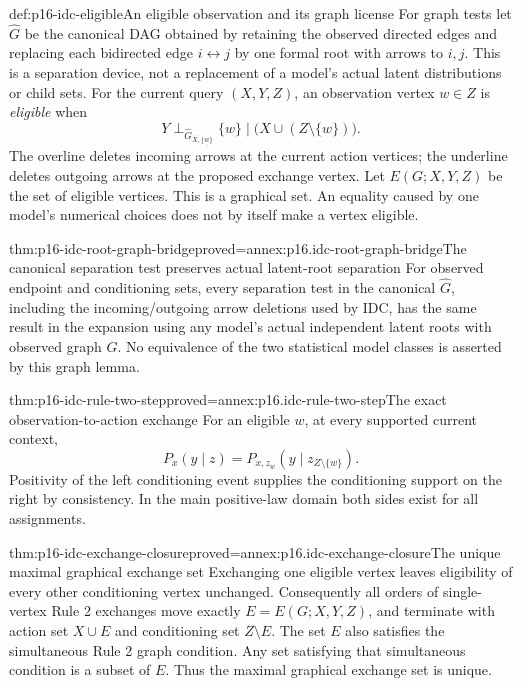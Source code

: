 \begin{hbdefinition}{def:p16-idc-eligible}{An eligible observation and its graph license}
For graph tests let \(\widehat G\) be the canonical DAG obtained
by retaining the observed directed edges and replacing each bidirected
edge \(i\leftrightarrow j\) by one formal root with arrows to
\(i,j\). This is a separation device, not a replacement of a
model's actual latent distributions or child sets. For the current query \((X,Y,Z)\), an
observation vertex \(w\in Z\) is \emph{eligible} when
\[
 Y\mathrel{\perp_{\widehat G_{\overline X,\underline{\{w\}}}}}
       \{w\}\mid\bigl(X\cup(Z\setminus\{w\})\bigr).
\]
The overline deletes incoming arrows at the current action vertices;
the underline deletes outgoing arrows at the proposed exchange vertex.
Let \(E(G;X,Y,Z)\) be the set of eligible vertices. This is a
graphical set. An equality caused by one model's numerical choices
does not by itself make a vertex eligible.
\end{hbdefinition}

\begin{hblemma}{thm:p16-idc-root-graph-bridge}{proved=annex:p16.idc-root-graph-bridge}{The canonical separation test preserves actual latent-root separation}
For observed endpoint and conditioning sets, every separation test in
the canonical \(\widehat G\), including the incoming/outgoing
arrow deletions used by IDC, has the same result in the expansion
using any model's actual independent latent roots with observed graph
\(G\). No equivalence of the two statistical model classes is
asserted by this graph lemma.
\end{hblemma}

\begin{hblemma}{thm:p16-idc-rule-two-step}{proved=annex:p16.idc-rule-two-step}{The exact observation-to-action exchange}
For an eligible \(w\), at every supported current context,
\[
 P_x(y\mid z)=P_{x,z_w}(y\mid z_{Z\setminus\{w\}}).
\]
Positivity of the left conditioning event supplies the conditioning
support on the right by consistency. In the main positive-law domain
both sides exist for all assignments.
\end{hblemma}

\begin{hbtheorem}{thm:p16-idc-exchange-closure}{proved=annex:p16.idc-exchange-closure}{The unique maximal graphical exchange set}
Exchanging one eligible vertex leaves eligibility of every other
conditioning vertex unchanged. Consequently all orders of single-vertex
Rule 2 exchanges move exactly \(E=E(G;X,Y,Z)\), and terminate
with action set \(X\cup E\) and conditioning set \(Z\setminus E\).
The set \(E\) also satisfies the simultaneous Rule 2 graph
condition. Any set satisfying that simultaneous condition is a subset
of \(E\). Thus the maximal graphical exchange set is unique.
\end{hbtheorem}

